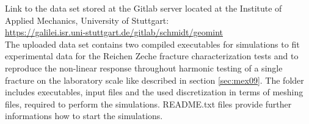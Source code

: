 Link to the data set stored at the Gitlab server located at the Institute of Applied Mechanics, University of Stuttgart:\\
\hyperlink{https://galilei.isr.uni-stuttgart.de/gitlab/schmidt/geomint}{https://galilei.isr.uni-stuttgart.de/gitlab/schmidt/geomint}\\

The uploaded data set contains two compiled executables for simulations to fit experimental data for the Reichen Zeche fracture characterization tests and to reproduce the non-linear response throughout harmonic testing of a single fracture on the laboratory scale like described in section \ref{sec:mex09}. The folder includes executables, input files and the used discretization in terms of meshing files, required to perform the simulations. README.txt files provide further informations how to start the simulations.